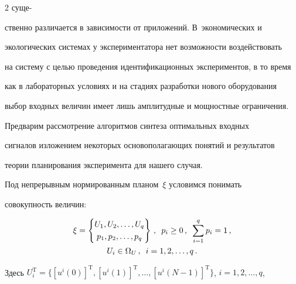 \begin{multicols}{2}
суще-\linebreak\vspace*{-12pt}


\pagebreak





\noindent


ственно различается в зависимости от приложений. В~экономических и


экологических системах у экспериментатора нет возможности воздействовать


на систему с целью проведения идентификационных экспериментов, в то время


как в лабораторных условиях и на стадиях разработки нового оборудования


выбор входных величин имеет лишь амплитудные и мощностные ограничения.





  Предварим рассмотрение алгоритмов синтеза оптимальных входных


сигналов изложением некоторых основополагающих понятий и результатов


теории планирования эксперимента для нашего случая.





  Под непрерывным нормированным планом~$\xi$ условимся понимать


совокупность величин:


  \begin{multline}


  \xi =


    \left \{


  \begin{matrix}


  U_1, U_2, \ldots , U_q\\[3pt]


  p_1, p_2, \ldots , p_q


  \end{matrix}


  \right \}\,, \enskip p_i\geq 0\,,\enskip


  \sum\limits_{i=1}^q p_i=1\,,\\


  U_i\in \Omega_U\,,\enskip   i=1, 2, \ldots , q\,.


    \label{e16-c}


\end{multline}


Здесь $U_i^{\mathrm{T}}=\{[u^i(0)]^{\mathrm{T}}, [u^i(1)]^{\mathrm{T}}, \ldots , [u^i(N-1)]^{\mathrm{T}}\}$, $i=1, 2, \ldots ,q$,



\end{multicols}
